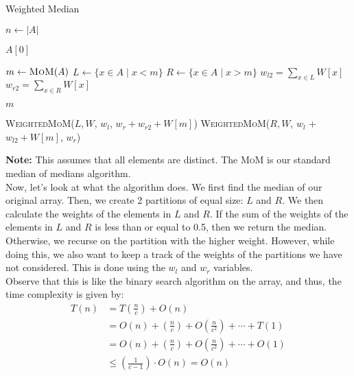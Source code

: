 \documentclass[a4paper]{article}
\begin{document}
\begin{algorithm}
\caption{Weighted Median}
\begin{algorithmic}[1]
    \State $n \gets |A|$

    \vspace{2mm}
        \State \Return $A[0]$
    \EndIf

    \vspace{2mm}
    \State $m \gets \textsc{MoM}(A)$
    \vspace{2mm}
    \State $L \gets \{x \in A \mid x < m\}$
    \State $R \gets \{x \in A \mid x > m\}$
    \vspace{2mm}
    \State $w_{l2} = \sum_{x \in L} W[x]$
    \State $w_{r2} = \sum_{x \in R} W[x]$
    \vspace{2mm}

        \State \Return $m$
    \EndIf

    \vspace{2mm}
        \State \Return \textsc{WeightedMoM}($L, W$, $w_l$, $w_r + w_{r2} + W[m]$)
    \Else
        \State \Return \textsc{WeightedMoM}($R, W$, $w_l$ + $w_{l2} + W[m]$, $w_r$)
    \EndIf

\EndFunction
\end{algorithmic}
\end{algorithm}

\noindent \textbf{Note:} This assumes that all elements are distinct. The \textsc{MoM} is our standard median of medians algorithm.\\

\noindent Now, let's look at what the algorithm does. We first find the median of our original array. Then, we create 2 partitions of equal size: $L$ and $R$. We then calculate the weights of the elements in $L$ and $R$. If the sum of the weights of the elements in $L$ and $R$ is less than or equal to 0.5, then we return the median. Otherwise, we recurse on the partition with the higher weight. However, while doing this, we also want to keep a track of the weights of the partitions we have not considered. This is done using the $w_l$ and $w_r$ variables.\\

\noindent Observe that this is like the binary search algorithm on the array, and thus, the time complexity is given by:
\begin{align*}
    T(n) &= T(\frac{n}{c}) + O(n) \\
    &= O(n) + (\frac{n}{c}) + O(\frac{n}{c^2}) + \cdots + T(1)\\
    &= O(n) + (\frac{n}{c}) + O(\frac{n}{c^2}) + \cdots + O(1)\\
    &\leq \left( \frac{1}{c - 1}\right) \cdot O(n) = O(n)
\end{align*}
\end{document}
